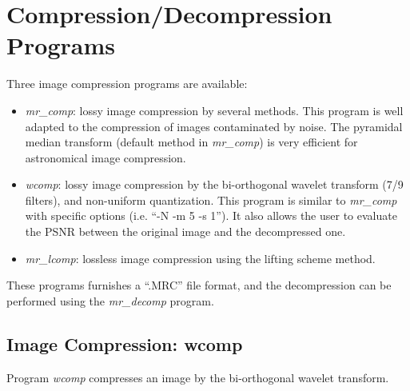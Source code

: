 \section{Compression/Decompression Programs}
Three image compression programs are available:
\begin{itemize}
\item {\em mr\_comp}: lossy image compression by several methods. This 
program is well adapted to the compression of images contaminated by noise.
The pyramidal median transform (default method in {\em mr\_comp}) 
is very efficient for astronomical image compression. 
\item {\em wcomp}: lossy image compression by the bi-orthogonal wavelet
transform (7/9 filters), and non-uniform quantization. This program
is similar to {\em mr\_comp} with specific options (i.e. ``-N -m 5 -s 1'').
It also allows the user to evaluate the PSNR between the original image
and the decompressed one.
\item {\em mr\_lcomp}: lossless image compression using the lifting scheme
method.
\end{itemize}
These programs furnishes a ``.MRC'' file format, and the decompression
can be performed using the {\em mr\_decomp} program.  

\subsection{Image Compression: wcomp}
Program {\em wcomp} compresses an 
image by the bi-orthogonal wavelet transform.

